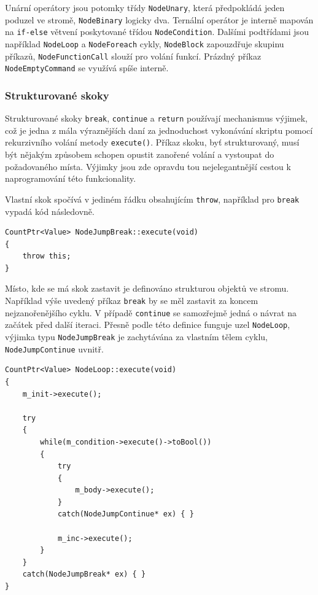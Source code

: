 \documentclass[11pt,twoside,a4paper]{book}
\begin{document}
Unární operátory jsou potomky třídy \texttt{NodeUnary}, která předpokládá jeden poduzel ve stromě, \texttt{NodeBinary} logicky dva. Ternální operátor je interně mapován na \texttt{if-else} větvení poskytované třídou \texttt{NodeCondition}. Dalšími podtřídami jsou například \texttt{Node\-Loop} a \texttt{NodeForeach} cykly, \texttt{NodeBlock} zapouzdřuje skupinu příkazů, \texttt{Node\-Function\-Call} slouží pro volání funkcí. Prázdný příkaz \texttt{NodeEmptyCommand} se využívá spíše interně.


\subsubsection{Strukturované skoky}

Strukturované skoky \texttt{break}, \texttt{continue} a \texttt{return} používají mechanismus výjimek, což je jedna z mála výraznějších daní za jednoduchost vykonávání skriptu pomocí rekurzivního volání metody \texttt{execute()}. Příkaz skoku, byť strukturovaný, musí být nějakým způsobem schopen opustit zanořené volání a vystoupat do požadovaného místa. Výjimky jsou zde opravdu tou nejelegantnější cestou k naprogramování této funkcionality.

Vlastní skok spočívá v jediném řádku obsahujícím \texttt{throw}, například pro \texttt{break} vypadá kód následovně.

\begin{verbatim}
CountPtr<Value> NodeJumpBreak::execute(void)
{
    throw this;
}
\end{verbatim}

Místo, kde se má skok zastavit je definováno strukturou objektů ve stromu. Například výše uvedený příkaz \texttt{break} by se měl zastavit za koncem nejzanořenějšího cyklu. V případě \texttt{continue} se samozřejmě jedná o návrat na začátek před další iteraci. Přesně podle této definice funguje uzel \texttt{NodeLoop}, výjimka typu \texttt{NodeJumpBreak} je zachytávána za vlastním tělem cyklu, \texttt{NodeJumpContinue} uvnitř.

\begin{verbatim}
CountPtr<Value> NodeLoop::execute(void)
{
    m_init->execute();

    try
    {
        while(m_condition->execute()->toBool())
        {
            try
            {
                m_body->execute();
            }
            catch(NodeJumpContinue* ex) { }

            m_inc->execute();
        }
    }
    catch(NodeJumpBreak* ex) { }
}
\end{verbatim}
\end{document}
